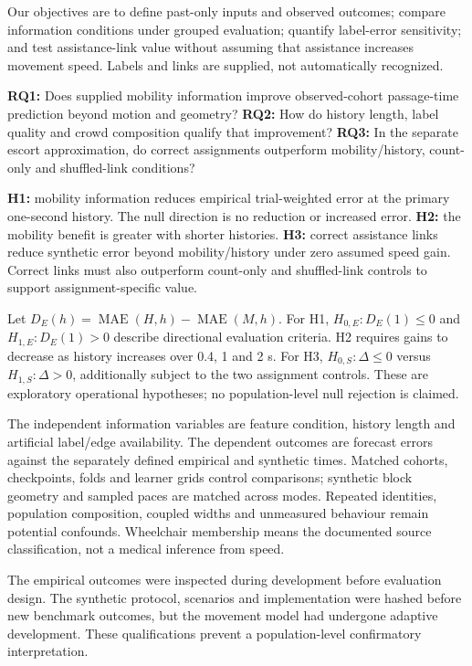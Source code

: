 \documentclass[conference]{IEEEtran}
\begin{document}
Our objectives are to define past-only inputs and observed outcomes; compare information conditions under grouped evaluation; quantify label-error sensitivity; and test assistance-link value without assuming that assistance increases movement speed. Labels and links are supplied, not automatically recognized.

\textbf{RQ1:} Does supplied mobility information improve observed-cohort passage-time prediction beyond motion and geometry? \textbf{RQ2:} How do history length, label quality and crowd composition qualify that improvement? \textbf{RQ3:} In the separate escort approximation, do correct assignments outperform mobility/history, count-only and shuffled-link conditions?

\textbf{H1:} mobility information reduces empirical trial-weighted error at the primary one-second history. The null direction is no reduction or increased error. \textbf{H2:} the mobility benefit is greater with shorter histories. \textbf{H3:} correct assistance links reduce synthetic error beyond mobility/history under zero assumed speed gain. Correct links must also outperform count-only and shuffled-link controls to support assignment-specific value.

Let $D_E(h)=\operatorname{MAE}(H,h)-\operatorname{MAE}(M,h)$. For H1, $H_{0,E}:D_E(1)\leq0$ and $H_{1,E}:D_E(1)>0$ describe directional evaluation criteria. H2 requires gains to decrease as history increases over 0.4, 1 and 2 s. For H3, $H_{0,S}:\Delta\leq0$ versus $H_{1,S}:\Delta>0$, additionally subject to the two assignment controls. These are exploratory operational hypotheses; no population-level null rejection is claimed.

The independent information variables are feature condition, history length and artificial label/edge availability. The dependent outcomes are forecast errors against the separately defined empirical and synthetic times. Matched cohorts, checkpoints, folds and learner grids control comparisons; synthetic block geometry and sampled paces are matched across modes. Repeated identities, population composition, coupled widths and unmeasured behaviour remain potential confounds. Wheelchair membership means the documented source classification, not a medical inference from speed.

The empirical outcomes were inspected during development before evaluation design. The synthetic protocol, scenarios and implementation were hashed before new benchmark outcomes, but the movement model had undergone adaptive development. These qualifications prevent a population-level confirmatory interpretation.
\end{document}
